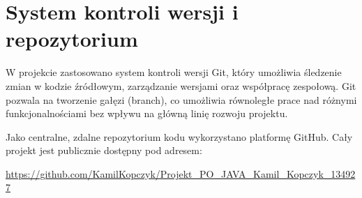 \section{System kontroli wersji i repozytorium}
W projekcie zastosowano system kontroli wersji Git, który umożliwia śledzenie zmian w kodzie źródłowym, zarządzanie wersjami oraz współpracę zespołową. Git pozwala na tworzenie gałęzi (branch), co umożliwia równoległe prace nad różnymi funkcjonalnościami bez wpływu na główną linię rozwoju projektu.

Jako centralne, zdalne repozytorium kodu wykorzystano platformę GitHub. Cały projekt jest publicznie dostępny pod adresem:
\begin{center}
    \url{https://github.com/KamilKopczyk/Projekt_PO_JAVA_Kamil_Kopczyk_134927}
\end{center}



\clearpage
